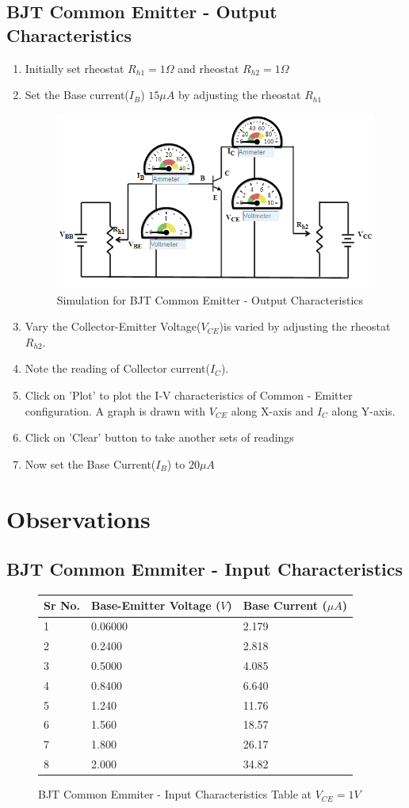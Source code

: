 		\subsection{BJT Common Emitter - Output Characteristics}
			\begin{enumerate}
				\tightlist
				\item Initially set rheostat $R_{h1} = 1\Omega$ and rheostat $R_{h2} = 1\Omega$
				\item Set the Base current($I_B$) $15\mu A$ by adjusting the rheostat $R_{h1}$
				\begin{figure}[h]
					\centering
					\includegraphics[width=0.7\linewidth]{img/exp9/7}
					\caption{Simulation for BJT Common Emitter - Output Characteristics}
					\label{fig:bjt_procedure_output}
				\end{figure}
				\item Vary the Collector-Emitter Voltage($V_{CE}$)is varied by adjusting the rheostat $R_{h2}$.
				\item Note the reading of Collector current($I_C$).
				\item Click on 'Plot' to plot the I-V characteristics of Common - Emitter configuration. A graph is drawn with $V_{CE}$ along X-axis and $I_C$ along Y-axis.
				\item Click on 'Clear' button to take another sets of readings
				\item Now set the Base Current($I_B$) to $20\mu A$
			\end{enumerate}
	
	\section{Observations}
		\subsection{BJT Common Emmiter - Input Characteristics}
			\begin{figure}[h]
				\begin{longtable}[]{@{}lll@{}}
					\toprule
					Sr No. & Base-Emitter Voltage ($V$) & Base Current ($\mu A$)\tabularnewline
					\midrule
					\endhead
					1 & 0.06000 & 2.179\tabularnewline
					2 & 0.2400 & 2.818\tabularnewline
					3 & 0.5000 & 4.085\tabularnewline
					4 & 0.8400 & 6.640\tabularnewline
					5 & 1.240 & 11.76\tabularnewline
					6 & 1.560 & 18.57\tabularnewline
					7 & 1.800 & 26.17\tabularnewline
					8 & 2.000 & 34.82\tabularnewline
					\bottomrule
				\end{longtable}
				\caption{BJT Common Emmiter - Input Characteristics Table at $V_{CE} = 1 V$}
			\end{figure}
			
